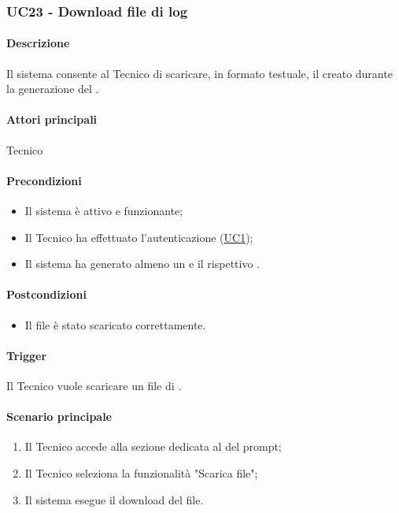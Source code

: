 \subsubsection{UC23 - Download file di log}\label{UC23}
\paragraph*{Descrizione}
Il sistema consente al Tecnico di scaricare, in formato testuale, il  creato durante la generazione del .

\paragraph*{Attori principali}
Tecnico

\paragraph*{Precondizioni}
\begin{itemize}
  \item Il sistema è attivo e funzionante;
  \item Il Tecnico ha effettuato l'autenticazione (\hyperref[UC1]{UC1});
  \item Il sistema ha generato almeno un  e il rispettivo .
\end{itemize}

\paragraph*{Postcondizioni}
\begin{itemize}
  \item Il file è stato scaricato correttamente.
\end{itemize}

\paragraph*{Trigger}
Il Tecnico vuole scaricare un file di .

\paragraph*{Scenario principale}
\begin{enumerate}
  \item Il Tecnico accede alla sezione dedicata al  del prompt;
  \item Il Tecnico seleziona la funzionalità "Scarica file";
  \item Il sistema esegue il download del file.
\end{enumerate}

